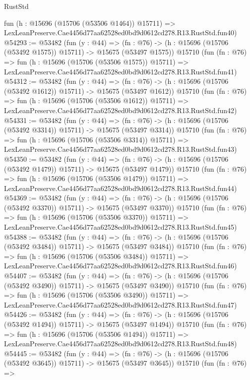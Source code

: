 \begin{lexlean}{RustStd}
\begin{coremodule}
    fun (h : @15696 (@15706 (@53506 @1464)) @15711) =>
    LexLeanPreserve.Cae4456d77aa62528ed0bd9d0612cd278.R13.RustStd.fun40)
@54293 := @53482
    (fun (y : @44) =>
    (fn : @76) -> (h : @15696 (@15706 (@53492 @1575)) @15711) -> @15675 (@53497 @1575))
    @15710
    (fun (fn : @76) =>
    fun (h : @15696 (@15706 (@53506 @1575)) @15711) =>
    LexLeanPreserve.Cae4456d77aa62528ed0bd9d0612cd278.R13.RustStd.fun41)
@54312 := @53482
    (fun (y : @44) =>
    (fn : @76) -> (h : @15696 (@15706 (@53492 @1612)) @15711) -> @15675 (@53497 @1612))
    @15710
    (fun (fn : @76) =>
    fun (h : @15696 (@15706 (@53506 @1612)) @15711) =>
    LexLeanPreserve.Cae4456d77aa62528ed0bd9d0612cd278.R13.RustStd.fun42)
@54331 := @53482
    (fun (y : @44) =>
    (fn : @76) -> (h : @15696 (@15706 (@53492 @3314)) @15711) -> @15675 (@53497 @3314))
    @15710
    (fun (fn : @76) =>
    fun (h : @15696 (@15706 (@53506 @3314)) @15711) =>
    LexLeanPreserve.Cae4456d77aa62528ed0bd9d0612cd278.R13.RustStd.fun43)
@54350 := @53482
    (fun (y : @44) =>
    (fn : @76) -> (h : @15696 (@15706 (@53492 @1479)) @15711) -> @15675 (@53497 @1479))
    @15710
    (fun (fn : @76) =>
    fun (h : @15696 (@15706 (@53506 @1479)) @15711) =>
    LexLeanPreserve.Cae4456d77aa62528ed0bd9d0612cd278.R13.RustStd.fun44)
@54369 := @53482
    (fun (y : @44) =>
    (fn : @76) -> (h : @15696 (@15706 (@53492 @3370)) @15711) -> @15675 (@53497 @3370))
    @15710
    (fun (fn : @76) =>
    fun (h : @15696 (@15706 (@53506 @3370)) @15711) =>
    LexLeanPreserve.Cae4456d77aa62528ed0bd9d0612cd278.R13.RustStd.fun45)
@54388 := @53482
    (fun (y : @44) =>
    (fn : @76) -> (h : @15696 (@15706 (@53492 @3484)) @15711) -> @15675 (@53497 @3484))
    @15710
    (fun (fn : @76) =>
    fun (h : @15696 (@15706 (@53506 @3484)) @15711) =>
    LexLeanPreserve.Cae4456d77aa62528ed0bd9d0612cd278.R13.RustStd.fun46)
@54407 := @53482
    (fun (y : @44) =>
    (fn : @76) -> (h : @15696 (@15706 (@53492 @3490)) @15711) -> @15675 (@53497 @3490))
    @15710
    (fun (fn : @76) =>
    fun (h : @15696 (@15706 (@53506 @3490)) @15711) =>
    LexLeanPreserve.Cae4456d77aa62528ed0bd9d0612cd278.R13.RustStd.fun47)
@54426 := @53482
    (fun (y : @44) =>
    (fn : @76) -> (h : @15696 (@15706 (@53492 @1494)) @15711) -> @15675 (@53497 @1494))
    @15710
    (fun (fn : @76) =>
    fun (h : @15696 (@15706 (@53506 @1494)) @15711) =>
    LexLeanPreserve.Cae4456d77aa62528ed0bd9d0612cd278.R13.RustStd.fun48)
@54445 := @53482
    (fun (y : @44) =>
    (fn : @76) -> (h : @15696 (@15706 (@53492 @3645)) @15711) -> @15675 (@53497 @3645))
    @15710
    (fun (fn : @76) =>

\end{coremodule}
\end{lexlean}
